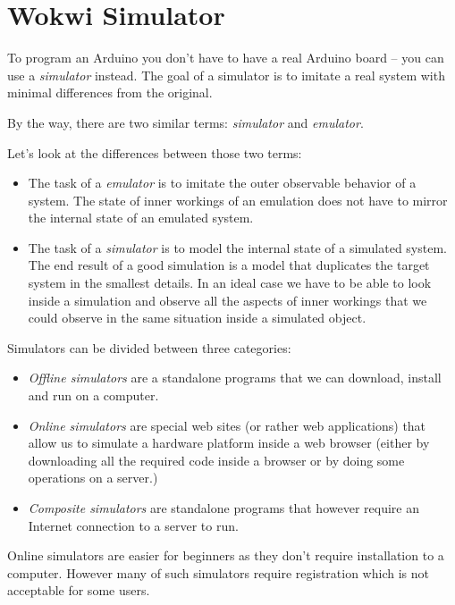 \documentclass[../sparc.tex]{subfiles}
\begin{document}
\section{Wokwi Simulator}

To program an Arduino you don't have to have a real Arduino board -- you can use
a \emph{simulator} instead.  The goal of a simulator is to imitate a real system
with minimal differences from the original.

By the way, there are two similar terms: \emph{simulator} and \emph{emulator}.

Let's look at the differences\cite{so:simulator-vs-emulator} between those two
terms:

\begin{itemize}
\item The task of a \emph{emulator} is to imitate the outer observable behavior
  of a system.  The state of inner workings of an emulation does not have to
  mirror the internal state of an emulated system.
\item The task of a \emph{simulator} is to model the internal state of a
  simulated system.  The end result of a good simulation is a model that
  duplicates the target system in the smallest details.  In an ideal case we
  have to be able to look inside a simulation and observe all the aspects of
  inner workings that we could observe in the same situation inside a simulated
  object.
\end{itemize}

Simulators can be divided between three categories:
\begin{itemize}
\item \emph{Offline simulators} are a standalone programs that we can download,
  install and run on a computer.
\item \emph{Online simulators} are special web sites (or rather web
  applications) that allow us to simulate a hardware platform inside a web
  browser (either by downloading all the required code inside a browser or by
  doing some operations on a server.)
\item \emph{Composite simulators} are standalone programs that however require
  an Internet connection to a server to run.
\end{itemize}

Online simulators are easier for beginners as they don't require installation to
a computer.  However many of such simulators require registration which is not
acceptable for some users.
\end{document}
